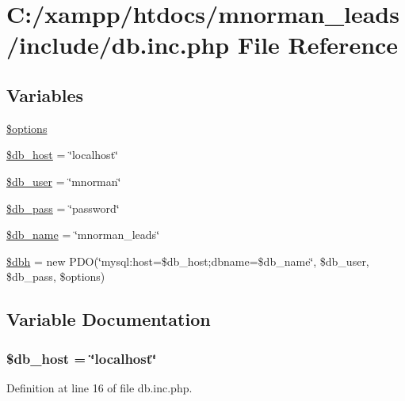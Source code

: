 \hypertarget{db_8inc_8php}{\section{C\-:/xampp/htdocs/mnorman\-\_\-leads/include/db.inc.\-php File Reference}
\label{db_8inc_8php}
}
\subsection*{Variables}
\begin{DoxyCompactItemize}
\item 
\hyperlink{db_8inc_8php_a011800c63ece4cbbfa77136a20607023}{\$options}
\item 
\hyperlink{db_8inc_8php_a127f40bba7579be61826b0ebd636b5b1}{\$db\-\_\-host} = \char`\"{}localhost\char`\"{}
\item 
\hyperlink{db_8inc_8php_a6a2ff59abacecba75a151826de414a27}{\$db\-\_\-user} = \char`\"{}mnorman\char`\"{}
\item 
\hyperlink{db_8inc_8php_a6a1544d19fb430d3665ad3744747197a}{\$db\-\_\-pass} = \char`\"{}password\char`\"{}
\item 
\hyperlink{db_8inc_8php_a26dcb19f4431598ddd5f58147f131bee}{\$db\-\_\-name} = \char`\"{}mnorman\-\_\-leads\char`\"{}
\item 
\hyperlink{db_8inc_8php_acc1e62674bb7200ea73767c19dc1344d}{\$dbh} = new P\-D\-O(\char`\"{}mysql\-:host=\$db\-\_\-host;dbname=\$db\-\_\-name\char`\"{}, \$db\-\_\-user, \$db\-\_\-pass, \$options)
\end{DoxyCompactItemize}


\subsection{Variable Documentation}
\hypertarget{db_8inc_8php_a127f40bba7579be61826b0ebd636b5b1}{
\subsubsection[{\$db\-\_\-host}]{\setlength{\rightskip}{0pt plus 5cm}\$db\-\_\-host = \char`\"{}localhost\char`\"{}}}\label{db_8inc_8php_a127f40bba7579be61826b0ebd636b5b1}


Definition at line 16 of file db.\-inc.\-php.

